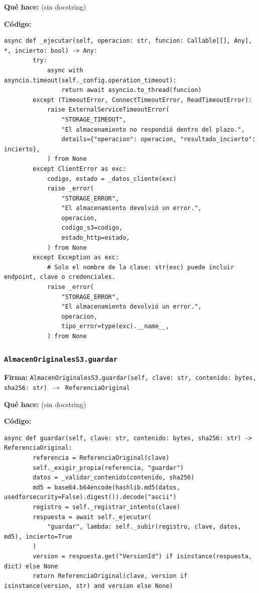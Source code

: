 \documentclass[11pt,a4paper]{article}
\begin{document}
\textbf{Qué hace:} (sin docstring)

\textbf{Código:}
\begin{lstlisting}
async def _ejecutar(self, operacion: str, funcion: Callable[[], Any], *, incierto: bool) -> Any:
        try:
            async with asyncio.timeout(self._config.operation_timeout):
                return await asyncio.to_thread(funcion)
        except (TimeoutError, ConnectTimeoutError, ReadTimeoutError):
            raise ExternalServiceTimeoutError(
                "STORAGE_TIMEOUT",
                "El almacenamiento no respondió dentro del plazo.",
                details={"operacion": operacion, "resultado_incierto": incierto},
            ) from None
        except ClientError as exc:
            codigo, estado = _datos_cliente(exc)
            raise _error(
                "STORAGE_ERROR",
                "El almacenamiento devolvió un error.",
                operacion,
                codigo_s3=codigo,
                estado_http=estado,
            ) from None
        except Exception as exc:
            # Solo el nombre de la clase: str(exc) puede incluir endpoint, clave o credenciales.
            raise _error(
                "STORAGE_ERROR",
                "El almacenamiento devolvió un error.",
                operacion,
                tipo_error=type(exc).__name__,
            ) from None
\end{lstlisting}

\subsubsection*{\texttt{AlmacenOriginalesS3.guardar}}
\textbf{Firma:} \texttt{AlmacenOriginalesS3.guardar(self, clave: str, contenido: bytes, sha256: str) $\rightarrow$ ReferenciaOriginal}

\textbf{Qué hace:} (sin docstring)

\textbf{Código:}
\begin{lstlisting}
async def guardar(self, clave: str, contenido: bytes, sha256: str) -> ReferenciaOriginal:
        referencia = ReferenciaOriginal(clave)
        self._exigir_propia(referencia, "guardar")
        datos = _validar_contenido(contenido, sha256)
        md5 = base64.b64encode(hashlib.md5(datos, usedforsecurity=False).digest()).decode("ascii")
        registro = self._registrar_intento(clave)
        respuesta = await self._ejecutar(
            "guardar", lambda: self._subir(registro, clave, datos, md5), incierto=True
        )
        version = respuesta.get("VersionId") if isinstance(respuesta, dict) else None
        return ReferenciaOriginal(clave, version if isinstance(version, str) and version else None)
\end{lstlisting}
\end{document}
